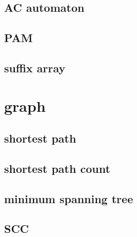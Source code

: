 \documentclass[UTF8, a4paper, titlepage, twoside]{ctexart}
\begin{document}
  \subsection{AC automaton}

  \subsection{PAM}
    

  \subsection{suffix array}
    

\section{graph}
  \subsection{shortest path}
    
    
    
    
    

  \subsection{shortest path count}
    
    

  \subsection{minimum spanning tree}
    
    
    

  \subsection{SCC}
    
    
    
\end{document}
